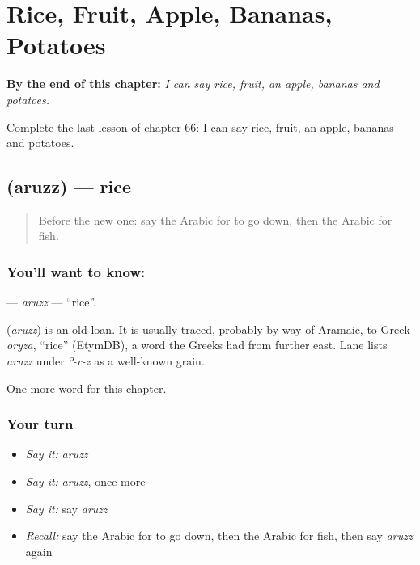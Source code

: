 
\chapter{Rice, Fruit, Apple, Bananas, Potatoes}
\label{ch:ar-rice-fruit-apple-bananas-potatoes}

\begin{chapteropening}
\textbf{By the end of this chapter:} \emph{I can say rice, fruit, an apple, bananas and potatoes.}

Complete the last lesson of chapter 66: I can say rice, fruit, an apple, bananas and potatoes.
\end{chapteropening}

\section[\texorpdfstring{\ar{أرز} (aruzz)}{أرز (aruzz)}]{ (aruzz) — rice}

\label{lesson:AR-C66-aruzz}



\begin{quote}
Before the new one: say the Arabic for to go down, then the Arabic for fish.
\end{quote}

\subsection*{You'll want to know: }
\textbf{} — \emph{aruzz} — \textquotedblleft{}rice\textquotedblright{}.

\begin{cousinweb}
\textbf{} (\emph{aruzz}) is an old loan. It is usually traced, probably by way of Aramaic, to Greek \emph{oryza}, \textquotedblleft{}rice\textquotedblright{} (EtymDB), a word the Greeks had from further east. Lane lists \emph{aruzz} under \emph{ʾ-r-z} as a well-known grain.
\end{cousinweb}

\begin{grammarlens}[title={What you've built}]
One more word for this chapter.
\end{grammarlens}

\subsection*{Your turn}
\begin{itemize}
\raggedright
  \item \emph{Say it:} \emph{aruzz}
  \item \emph{Say it:} \emph{aruzz}, once more
  \item \emph{Say it:} say \emph{aruzz}
  \item \emph{Recall:} say the Arabic for to go down, then the Arabic for fish, then say \emph{aruzz} again
\end{itemize}

